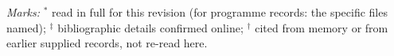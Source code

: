 \noindent\emph{Marks:} \(^{*}\) read in full for this revision
(for programme records: the specific files named);
\(^{\ddagger}\) bibliographic details confirmed online;
\(^{\dagger}\) cited from memory or from earlier supplied records,
not re-read here.
\medskip
